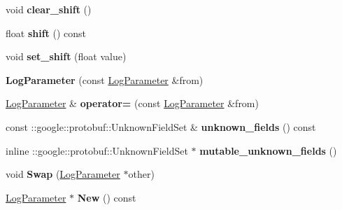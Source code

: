 \begin{DoxyCompactItemize}
void {\bfseries clear\+\_\+shift} ()
\item 
\mbox{\label{classcaffe_1_1_log_parameter_a746572e8045df27ea06c4d3df09607ba}} 
float {\bfseries shift} () const
\item 
\mbox{\label{classcaffe_1_1_log_parameter_abcabe37e5c92a7e87530a4205f5e2d25}} 
void {\bfseries set\+\_\+shift} (float value)
\item 
\mbox{\label{classcaffe_1_1_log_parameter_a0e07653142d87cd7ccb9204f44afb97f}} 
{\bfseries Log\+Parameter} (const \mbox{\hyperlink{classcaffe_1_1_log_parameter}{Log\+Parameter}} \&from)
\item 
\mbox{\label{classcaffe_1_1_log_parameter_a314f94a90c424f0217cfcc4cde48eb69}} 
\mbox{\hyperlink{classcaffe_1_1_log_parameter}{Log\+Parameter}} \& {\bfseries operator=} (const \mbox{\hyperlink{classcaffe_1_1_log_parameter}{Log\+Parameter}} \&from)
\item 
\mbox{\label{classcaffe_1_1_log_parameter_a79ee366f038eb5003d4a68ef7db7011e}} 
const \+::google\+::protobuf\+::\+Unknown\+Field\+Set \& {\bfseries unknown\+\_\+fields} () const
\item 
\mbox{\label{classcaffe_1_1_log_parameter_a7c2156fc8dab8ce80c6ce987bb40deee}} 
inline \+::google\+::protobuf\+::\+Unknown\+Field\+Set $\ast$ {\bfseries mutable\+\_\+unknown\+\_\+fields} ()
\item 
\mbox{\label{classcaffe_1_1_log_parameter_aa7932981e9e4debaa50ec9b553dc16d2}} 
void {\bfseries Swap} (\mbox{\hyperlink{classcaffe_1_1_log_parameter}{Log\+Parameter}} $\ast$other)
\item 
\mbox{\label{classcaffe_1_1_log_parameter_a1592bc743d6446b3a2936470a38cc525}} 
\mbox{\hyperlink{classcaffe_1_1_log_parameter}{Log\+Parameter}} $\ast$ {\bfseries New} () const
\item 
\mbox{\label{classcaffe_1_1_log_parameter_ad7a8c68335bcd1afb04ef175e7b06528}} 

\end{DoxyCompactItemize}
